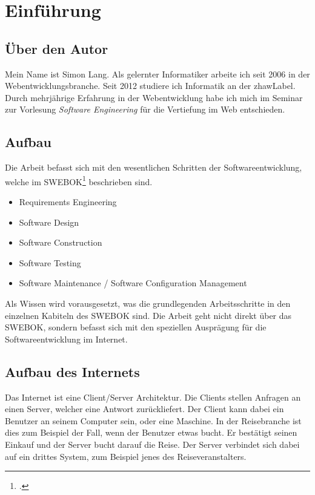 \chapter{Einführung}
\label{sec:einfuehrung}

\section{Über den Autor}
\label{sec:einfuehrung:autor}
Mein Name ist Simon Lang. Als gelernter Informatiker arbeite ich seit 2006 in der Webentwicklungsbranche.
Seit 2012 studiere ich Informatik an der \Gls{zhawLabel}.
Durch mehrjährige Erfahrung in der Webentwicklung habe ich mich im Seminar zur Vorlesung \textit{Software Engineering} für die Vertiefung im Web entschieden.

\section{Aufbau}
Die Arbeit befasst sich mit den wesentlichen Schritten der Softwareentwicklung, welche im SWEBOK\footcite{IEEE_Computer_Society_2015-05-30} beschrieben sind.
\begin{itemize}
\item Requirements Engineering
\item Software Design
\item Software Construction
\item Software Testing
\item Software Maintenance / Software Configuration Management
\end{itemize}

Als Wissen wird vorausgesetzt, was die grundlegenden Arbeitsschritte in den einzelnen Kabiteln des SWEBOK sind. Die Arbeit geht nicht direkt über das SWEBOK, sondern befasst sich mit den speziellen Ausprägung für die Softwareentwicklung im Internet.

\section{Aufbau des Internets}
Das Internet ist eine Client/Server Architektur. Die Clients stellen Anfragen an einen Server, welcher eine Antwort zurückliefert. Der Client kann dabei ein Benutzer an seinem Computer sein, oder eine Maschine. In der Reisebranche ist dies zum Beispiel der Fall, wenn der Benutzer etwas bucht. Er bestätigt seinen Einkauf und der Server bucht darauf die Reise. Der Server verbindet sich dabei auf ein drittes System, zum Beispiel jenes des Reiseveranstalters. 

